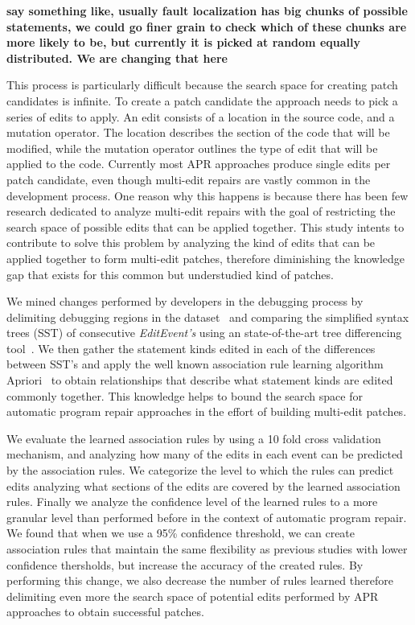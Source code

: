 \documentclass[sigconf]{acmart}
\newcommand{\todo}[1]
  {{\scriptsize \textbf{\color{red} {#1}}}}
\begin{document}
\todo{say something like, usually fault localization has big chunks of 
possible statements, we could go finer grain to check which 
of these chunks are more likely to be, but currently it is picked
at random equally distributed. We are changing that here}

This process is particularly difficult because the search space
for creating patch candidates is infinite. To create a patch 
candidate the approach needs to pick a series of edits to apply.
An edit consists of a location in the source code,
and a mutation operator. The location describes the section
of the code that will be modified, while the mutation operator
outlines the type of edit that will be applied to the code.
Currently most APR approaches produce single edits per patch
candidate, even though multi-edit repairs are vastly common in the 
development process. One reason why this happens is because
there has been few research dedicated to analyze multi-edit
repairs with the goal of restricting the search space of possible edits that 
can be applied together. This study intents to contribute to
solve this problem by analyzing  
the kind of edits that can be applied together to form
multi-edit patches, therefore diminishing the knowledge
gap that exists for this common but understudied kind of patches.

We mined changes performed by developers in the debugging
process by delimiting debugging regions in the dataset~\cite{msr18challenge} and comparing the simplified syntax
trees (SST) of consecutive \textit{EditEvent's} using an 
state-of-the-art tree differencing tool~\cite{Pawlik16Apted}.
We then gather the statement kinds edited in each of the 
differences between SST's and apply the well known association
rule learning algorithm Apriori~\cite{Agrawal94}
to obtain relationships that describe what statement kinds
are edited commonly together. This knowledge helps to 
bound the search space for automatic program repair approaches
in the effort of building multi-edit patches.

We evaluate the learned association rules by using a 10 fold
cross validation mechanism, and analyzing how many of the edits
in each event can be predicted by the association rules.
We categorize the level to which the rules can predict edits
analyzing what sections of the edits are covered by the 
learned association rules. Finally we analyze
the confidence level of the learned rules to a more granular 
level than performed before in the context of automatic
program repair. We found that when we use a 95\% confidence
threshold, we can create association
rules that maintain the same flexibility as previous
studies with lower confidence thersholds, but increase
the accuracy of the created rules.
By performing this change, we also
decrease the number of rules learned therefore
delimiting even more the search space of potential edits
performed by APR approaches to obtain successful patches.
\end{document}
